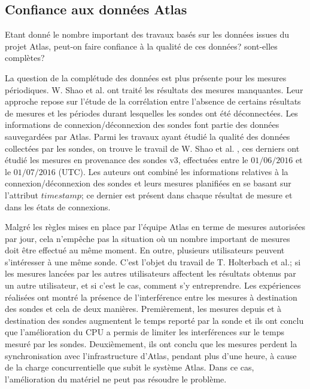 \subsection{Confiance aux données Atlas}

Etant donné le nombre important des travaux basés sur les données issues du projet Atlas, peut-on faire confiance à la qualité de ces données?  sont-elles complètes?

La question de la complétude des données est plus présente pour les mesures périodiques. W. Shao et al.  \cite{DBLP:journals/corr/ShaoRDV17} ont traité les résultats des mesures manquantes.  Leur approche  repose sur l'étude de la corrélation entre  l'absence de certains résultats de mesures et les périodes durant lesquelles les sondes  ont été déconnectées. 
Les informations de connexion/déconnexion des sondes font partie des données sauvegardées par  Atlas. Parmi les travaux ayant étudié la qualité des données collectées par les sondes, on trouve le travail de W. Shao et al.  \cite{DBLP:journals/corr/ShaoRDV17},  ces derniers  ont étudié les mesures en provenance des  sondes v$3$, effectuées entre le $01/06/2016$ et  le $01/07/2016$ (UTC). Les auteurs ont combiné les informations relatives à la connexion/déconnexion des sondes et leurs mesures planifiées en se basant sur l'attribut $timestamp$; ce dernier est présent dans chaque résultat de mesure et dans les états de connexions.


Malgré les règles mises en place par l'équipe Atlas en terme de mesures autorisées par jour, cela n'empêche pas la situation où 
 un nombre important de mesures  doit être effectué au même moment. En outre, plusieurs  utilisateurs peuvent s'intéresser à une même sonde. C'est l'objet du  travail \cite{Holterbach:2015:QIM:2815675.2815710} de T. Holterbach et al.; si les mesures lancées par les autres utilisateurs affectent les résultats obtenus par un autre utilisateur, et si c'est le cas, comment s'y entreprendre. Les expériences réalisées ont montré la présence de l'interférence entre les mesures à destination des sondes et cela de deux manières. Premièrement, les mesures depuis et à destination des sondes augmentent le temps reporté par la sonde et ils ont conclu que l'amélioration du CPU a permis de limiter les interférences sur le temps mesuré par les sondes. Deuxièmement,  ils ont conclu que les mesures perdent la synchronisation avec l'infrastructure d'Atlas, pendant plus d'une heure, à cause de la charge concurrentielle que subit le système Atlas. Dans ce cas, l'amélioration du matériel ne peut pas résoudre le problème.

